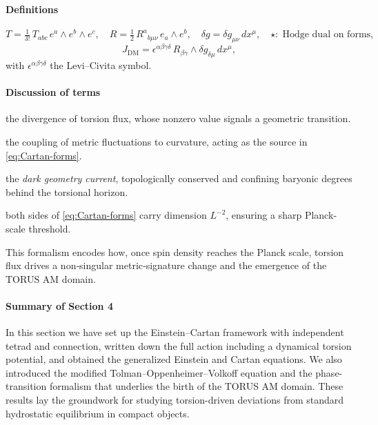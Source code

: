 \documentclass{article}
\begin{document}
\paragraph{Definitions}
\begin{equation}\label{eq:auto19}
T = \tfrac{1}{3!}\,T_{abc}\,e^a\wedge e^b\wedge e^c,
  \quad
  R = \tfrac{1}{2}\,R^a{}_{b\mu\nu}\,e_a\wedge e^b,
  \quad
  \delta g = \delta g_{\mu\nu}\,dx^\mu,
  \quad
  \star\colon\;\text{Hodge dual on forms},
\end{equation}
\begin{equation}\label{eq:auto20}
J_{\mathrm{DM}}
    = \epsilon^{\alpha\beta\gamma\delta}\,
      R_{\beta\gamma}\wedge\delta g_{\delta\mu}\,dx^\mu,
\end{equation}
with $\epsilon^{\alpha\beta\gamma\delta}$ the Levi–Civita symbol.

\paragraph{Discussion of terms}
\begin{description}[leftmargin=2em]
  \item[$d\star T$] the divergence of torsion flux, whose nonzero value signals a geometric transition.
  \item[$\delta g\wedge R$] the coupling of metric fluctuations to curvature, acting as the source in \eqref{eq:Cartan-forms}.
  \item[$J_{\mathrm{DM}}$] the \emph{dark geometry current}, topologically conserved and confining baryonic degrees behind the torsional horizon.
  \item[Dimensional balance] both sides of \eqref{eq:Cartan-forms} carry dimension $L^{-2}$, ensuring a sharp Planck‐scale threshold.
  \item[Physical role] This formalism encodes how, once spin density reaches the Planck scale, torsion flux drives a non‐singular metric‐signature change and the emergence of the TORUS AM domain.
\end{description}


\paragraph{Summary of Section 4}
In this section we have set up the Einstein–Cartan framework with independent tetrad and connection, written down the full action including a dynamical torsion potential, and obtained the generalized Einstein and Cartan equations.  We also introduced the modified Tolman–Oppenheimer–Volkoff equation and the phase-transition formalism that underlies the birth of the TORUS AM domain.  These results lay the groundwork for studying torsion-driven deviations from standard hydrostatic equilibrium in compact objects.
\end{document}
